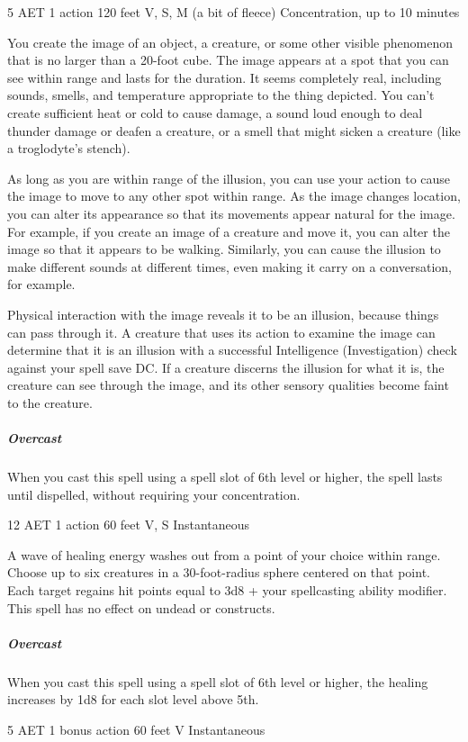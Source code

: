 \label{spell:major-image}
{5 AET}
{1 action}
{120 feet}
{V, S, M (a bit of fleece)}
{Concentration, up to 10 minutes}

You create the image of an object, a creature, or some other visible phenomenon that is no larger than a 20-foot cube. The image appears at a spot that you can see within range and lasts for the duration. It seems completely real, including sounds, smells, and temperature appropriate to the thing depicted. You can't create sufficient heat or cold to cause damage, a sound loud enough to deal thunder damage or deafen a creature, or a smell that might sicken a creature (like a troglodyte's stench).

As long as you are within range of the illusion, you can use your action to cause the image to move to any other spot within range. As the image changes location, you can alter its appearance so that its movements appear natural for the image. For example, if you create an image of a creature and move it, you can alter the image so that it appears to be walking. Similarly, you can cause the illusion to make different sounds at different times, even making it carry on a conversation, for example.

Physical interaction with the image reveals it to be an illusion, because things can pass through it. A creature that uses its action to examine the image can determine that it is an illusion with a successful Intelligence (Investigation) check against your spell save DC. If a creature discerns the illusion for what it is, the creature can see through the image, and its other sensory qualities become faint to the creature.
\subparagraph*{Overcast} When you cast this spell using a spell slot of 6th level or higher, the spell lasts until dispelled, without requiring your concentration.

\label{spell:mass-cure-wounds}
{12 AET}
{1 action}
{60 feet}
{V, S}
{Instantaneous}

A wave of healing energy washes out from a point of your choice within range. Choose up to six creatures in a 30-foot-radius sphere centered on that point. Each target regains hit points equal to 3d8 + your spellcasting ability modifier. This spell has no effect on undead or constructs.
\subparagraph*{Overcast} When you cast this spell using a spell slot of 6th level or higher, the healing increases by 1d8 for each slot level above 5th.

\label{spell:mass-healing-word}
{5 AET}
{1 bonus action}
{60 feet}
{V}
{Instantaneous}

